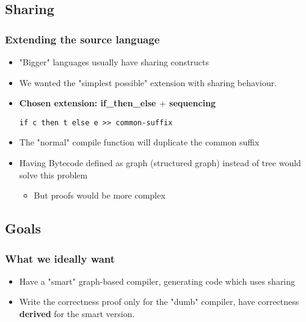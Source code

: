     \subsection{Sharing}
        \begin{frame}[fragile]
            \frametitle{Extending the source language}

            \begin{itemize}
                \item "Bigger" languages usually have sharing constructs
                \item We wanted the "simplest possible" extension with sharing behaviour.
                \item \textbf{Chosen extension: if\_then\_else $+$ sequencing}
                    \begin{verbatim}
if c then t else e >> common-suffix
                    \end{verbatim}
            \end{itemize}

            \begin{itemize}
                \item The "normal" compile function will duplicate the common suffix
                \item Having Bytecode defined as graph (structured graph) instead of tree
                    would solve this problem
                    \begin{itemize}
                        \item But proofs would be more complex
                    \end{itemize}
            \end{itemize}
\end{frame}


    \subsection{Goals}
        \begin{frame}
            \frametitle{What we ideally want}
            \begin{itemize}
                \item Have a "smart" graph-based compiler, generating code which uses sharing
                \item Write the correctness proof only for the "dumb" compiler,
                    have correctness \textbf{derived} for the smart version.
              \end{itemize}
        \end{frame}

